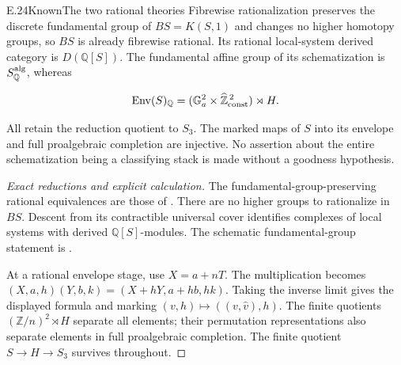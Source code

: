 \begin{statement}{E.24}{Known}{The two rational theories}
Fibrewise rationalization preserves the discrete
fundamental group of $BS=K(S,1)$ and changes no higher
homotopy groups, so $BS$ is already fibrewise rational.
Its rational local-system derived category is $D(\mathbb Q[S])$.
The fundamental affine group of its schematization is
$S_{\mathbb Q}^{\rm alg}$, whereas

$$
\operatorname{Env}(S)_{\mathbb Q}
 =(\mathbb G_a^2\times\widehat{\mathbb Z}_{\rm const}^{\,2})
       \rtimes H.
$$

All retain the reduction quotient to $S_3$.
The marked maps of $S$ into its envelope and full
proalgebraic completion are injective.
No assertion about the entire schematization being a
classifying stack is made without a goodness hypothesis.
\end{statement}
\begin{proof}[Exact reductions and explicit calculation]
The fundamental-group-preserving rational equivalences
are those of \cite[Theorem 3]{E_RiveraWierstraZeinalian2021}.
There are no higher groups to rationalize in $BS$.
Descent from its contractible universal cover identifies
complexes of local systems with derived $\mathbb Q[S]$-modules.
The schematic fundamental-group statement is
\cite[Corollary 3.3.7]{E_Toen2006}.

At a rational envelope stage, use $X=a+nT$.
The multiplication becomes
$(X,a,h)(Y,b,k)=(X+hY,a+hb,hk)$.
Taking the inverse limit gives the displayed formula
and marking $(v,h)\mapsto((v,\widehat v),h)$.
The finite quotients $(\mathbb Z/n)^2\rtimes H$ separate
all elements; their permutation representations also
separate elements in full proalgebraic completion.
The finite quotient $S\to H\to S_3$ survives throughout.
\end{proof}

